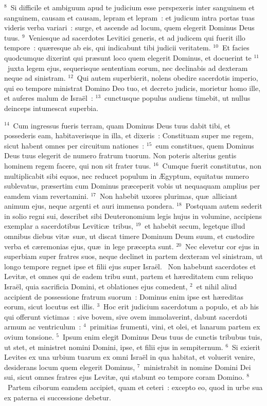 ${}^{8}$~Si difficile et ambiguum apud te judicium esse perspexeris inter sanguinem et sanguinem, causam et causam, lepram et lepram~: et judicum intra portas tuas videris verba variari~: surge, et ascende ad locum, quem elegerit Dominus Deus tuus.
${}^{9}$~Veniesque ad sacerdotes Levitici generis, et ad judicem qui fuerit illo tempore~: qu\ae resque ab eis, qui indicabunt tibi judicii veritatem.
${}^{10}$~Et facies quodcumque dixerint qui pr\ae sunt loco quem elegerit Dominus, et docuerint te
${}^{11}$~juxta legem ejus, sequerisque sententiam eorum, nec declinabis ad dexteram neque ad sinistram.
${}^{12}$~Qui autem superbierit, nolens obedire sacerdotis imperio, qui eo tempore ministrat Domino Deo tuo, et decreto judicis, morietur homo ille, et auferes malum de Isra\"el~:
${}^{13}$~cunctusque populus audiens timebit, ut nullus deinceps intumescat superbia.


${}^{14}$~Cum ingressus fueris terram, quam Dominus Deus tuus dabit tibi, et possederis eam, habitaverisque in illa, et dixeris~: Constituam super me regem, sicut habent omnes per circuitum nationes~:
${}^{15}$~eum constitues, quem Dominus Deus tuus elegerit de numero fratrum tuorum. Non poteris alterius gentis hominem regem facere, qui non sit frater tuus.
${}^{16}$~Cumque fuerit constitutus, non multiplicabit sibi equos, nec reducet populum in \AE gyptum, equitatus numero sublevatus, pr\ae sertim cum Dominus pr\ae ceperit vobis ut nequaquam amplius per eamdem viam revertamini.
${}^{17}$~Non habebit uxores plurimas, qu\ae\ alliciant animum ejus, neque argenti et auri immensa pondera.
${}^{18}$~Postquam autem sederit in solio regni sui, describet sibi Deuteronomium legis hujus in volumine, accipiens exemplar a sacerdotibus Levitic\ae\ tribus,
${}^{19}$~et habebit secum, legetque illud omnibus diebus vit\ae\ su\ae , ut discat timere Dominum Deum suum, et custodire verba et c\ae remonias ejus, qu\ae\ in lege pr\ae cepta sunt.
${}^{20}$~Nec elevetur cor ejus in superbiam super fratres suos, neque declinet in partem dexteram vel sinistram, ut longo tempore regnet ipse et filii ejus super Isra\"el.
~\lettrine[lines=10,image=true,loversize=0.05,lraise=-0.03]{N}{}on habebunt sacerdotes et Levit\ae , et omnes qui de eadem tribu sunt, partem et h\ae reditatem cum reliquo Isra\"el, quia sacrificia Domini, et oblationes ejus comedent,
${}^{2}$~et nihil aliud accipient de possessione fratrum suorum~: Dominus enim ipse est h\ae reditas eorum, sicut locutus est illis.
${}^{3}$~Hoc erit judicium sacerdotum a populo, et ab his qui offerunt victimas~: sive bovem, sive ovem immolaverint, dabunt sacerdoti armum ac ventriculum~:
${}^{4}$~primitias frumenti, vini, et olei, et lanarum partem ex ovium tonsione.
${}^{5}$~Ipsum enim elegit Dominus Deus tuus de cunctis tribubus tuis, ut stet, et ministret nomini Domini, ipse, et filii ejus in sempiternum.
${}^{6}$~Si exierit Levites ex una urbium tuarum ex omni Isra\"el in qua habitat, et voluerit venire, desiderans locum quem elegerit Dominus,
${}^{7}$~ministrabit in nomine Domini Dei sui, sicut omnes fratres ejus Levit\ae , qui stabunt eo tempore coram Domino.
${}^{8}$~Partem ciborum eamdem accipiet, quam et ceteri~: excepto eo, quod in urbe sua ex paterna ei successione debetur.


